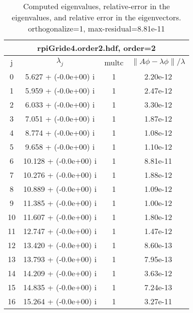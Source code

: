 \begin{table}[H]\tableFont %
\begin{center}
\begin{tabular}{|c|c|c|c|}  \hline
\multicolumn{4}{|c|}{rpiGride4.order2.hdf, order=2} \\ \hline
   j    &         $\lambda_j$      & multc & $\| A\phi - \lambda\phi\|/\lambda$     \\ \hline
     0  &      5.627 + (-0.0e+00) i   &   1     &    2.20e-12   \\
     1  &      5.959 + (-0.0e+00) i   &   1     &    2.47e-12   \\
     2  &      6.033 + (-0.0e+00) i   &   1     &    3.30e-12   \\
     3  &      7.051 + (-0.0e+00) i   &   1     &    1.87e-12   \\
     4  &      8.774 + (-0.0e+00) i   &   1     &    1.08e-12   \\
     5  &      9.658 + (-0.0e+00) i   &   1     &    1.10e-12   \\
     6  &     10.128 + (-0.0e+00) i   &   1     &    8.81e-11   \\
     7  &     10.276 + (-0.0e+00) i   &   1     &    1.88e-12   \\
     8  &     10.889 + (-0.0e+00) i   &   1     &    1.09e-12   \\
     9  &     11.385 + (-0.0e+00) i   &   1     &    1.00e-12   \\
    10  &     11.607 + (-0.0e+00) i   &   1     &    1.80e-12   \\
    11  &     12.747 + (-0.0e+00) i   &   1     &    1.47e-12   \\
    12  &     13.420 + (-0.0e+00) i   &   1     &    8.60e-13   \\
    13  &     13.793 + (-0.0e+00) i   &   1     &    7.95e-13   \\
    14  &     14.209 + (-0.0e+00) i   &   1     &    3.63e-12   \\
    15  &     14.835 + (-0.0e+00) i   &   1     &    7.24e-13   \\
    16  &     15.264 + (-0.0e+00) i   &   1     &    3.27e-11   \\
\hline
\end{tabular}
\caption{Computed eigenvalues, relative-error in the eigenvalues, and relative error in the eigenvectors. orthogonalize=1, max-residual=8.81e-11
}\label{table:genEigsrpiGride4.order2.hdf}
\end{center}
\end{table}
